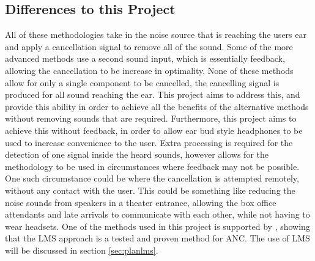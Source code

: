 \subsection{Differences to this Project}
All of these methodologies take in the noise source that is reaching the users ear and apply a cancellation signal to remove all of the sound.
Some of the more advanced methods use a second sound input, which is essentially feedback, allowing the cancellation to be increase in optimality.
None of these methods allow for only a single component to be cancelled, the cancelling signal is produced for all sound reaching the ear.
This project aims to address this, and provide this ability in order to achieve all the benefits of the alternative methods without removing sounds that are required.
Furthermore, this project aims to achieve this without feedback, in order to allow ear bud style headphones to be used to increase convenience to the user.
Extra processing is required for the detection of one signal inside the heard sounds, however allows for the methodology to be used in circumstances where feedback may not be possible.
One such circumstance could be where the cancellation is attempted remotely, without any contact with the user.
This could be something like reducing the noise sounds from speakers in a theater entrance, allowing the box office attendants and late arrivals to communicate with each other, while not having to wear headsets.
One of the methods used in this project is supported by \cite{EMHeadsets,EMNoiseCancel,2SensorANCAlg}, showing that the LMS approach is a tested and proven method for ANC.
The use of LMS will be discussed in section \ref{sec:planlms}.
